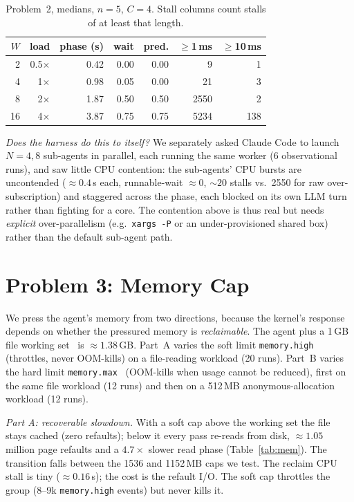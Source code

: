 \documentclass[10pt,conference]{IEEEtran}
\newcommand{\uu}[1]{\,\textsf{#1}}
\begin{document}
\begin{table}[t]\centering\scriptsize
\setlength{\tabcolsep}{4pt}
\caption{Problem~2, medians, $n{=}5$, $C{=}4$. Stall columns count stalls of at least that length.}
\label{tab:threads}
\begin{tabular}{@{}rrrrrrr@{}}
\toprule
$W$ & load & phase (s) & wait & pred. & $\ge$1\,ms & $\ge$10\,ms\\
\midrule
2  & 0.5$\times$ & 0.42 & 0.00 & 0.00 & 9    & 1 \\
4  & 1$\times$   & 0.98 & 0.05 & 0.00 & 21   & 3 \\
8  & 2$\times$   & 1.87 & 0.50 & 0.50 & 2550 & 2 \\
16 & 4$\times$   & 3.87 & 0.75 & 0.75 & 5234 & 138 \\
\bottomrule
\end{tabular}
\end{table}

\emph{Does the harness do this to itself?} We separately asked Claude Code
to launch $N{=}4,8$ sub-agents in parallel, each running the same worker (6
observational runs), and saw little CPU contention: the sub-agents' CPU
bursts are uncontended ($\approx\!0.4$\uu{s} each, runnable-wait
${\approx}0$, ${\sim}20$ stalls vs.\ 2550 for raw over-subscription) and
staggered across the phase, each blocked on its own LLM turn rather than
fighting for a core. The contention above is thus real but needs
\emph{explicit} over-parallelism (e.g.\ \texttt{xargs -P} or an
under-provisioned shared box) rather than the default sub-agent path.

\section{Problem 3: Memory Cap}
\label{sec:mem}

We press the agent's memory from two directions, because the kernel's
response depends on whether the pressured memory is \emph{reclaimable}. The
agent plus a 1\,GB file working set~\cite{denning1968} is
${\approx}1.38$\,GB. Part~A varies the soft limit \texttt{memory.high}~\cite{cgroupv2}
(throttles, never OOM-kills) on a file-reading workload (20 runs). Part~B
varies the hard limit \texttt{memory.max}~\cite{cgroupv2} (OOM-kills when
usage cannot be reduced), first on the same file workload (12 runs) and
then on a 512\,MB anonymous-allocation workload (12 runs).

\emph{Part A: recoverable slowdown.} With a soft cap above the working set
the file stays cached (zero refaults); below it every pass re-reads from
disk, ${\approx}1.05$ million page refaults and a $4.7\times$ slower read
phase (Table~\ref{tab:mem}). The transition falls between the 1536 and
1152\,MB caps we test. The reclaim CPU stall is tiny
(${\approx}0.16$\uu{s}); the cost is the refault I/O. The soft cap
throttles the group (8--9k \texttt{memory.high} events) but never kills
it.
\end{document}
